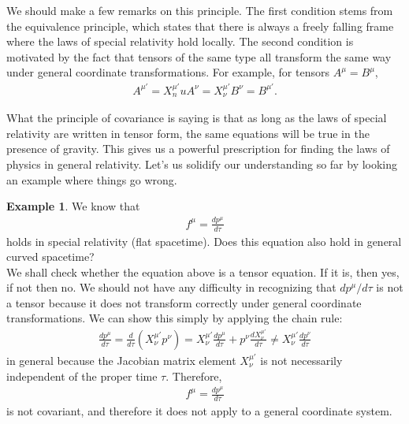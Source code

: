 \documentclass{book}
\theoremstyle{definition}
\newtheorem{exmp}{Example}[section]
\begin{document}
We should make a few remarks on this principle. The first condition stems from the equivalence principle, which states that there is always a freely falling frame where the laws of special relativity hold locally. The second condition is motivated by the fact that tensors of the same type all transform the same way under general coordinate transformations. For example, for tensors $A^{\mu} = B^\mu$,
\begin{align*}
A^{\mu'} = X^{\mu'}_nuA^\nu = X^{\mu'}_\nu B^{\nu} = B^{\mu'}.
\end{align*}

What the principle of covariance is saying is that as long as the laws of special relativity are written in tensor form, the same equations will be true in the presence of gravity. This gives us a powerful prescription for finding the laws of physics in general relativity. Let's us solidify our understanding so far by looking an example where things go wrong.\\
\begin{exmp}
	We know that 
	\begin{align*}
	f^\mu = \frac{dp^\mu}{d\tau}
	\end{align*}
	holds in special relativity (flat spacetime). Does this equation also hold in general curved spacetime?\\
	
	We shall check whether the equation above is a tensor equation. If it is, then yes, if not then no. We should not have any difficulty in recognizing that $dp^\mu/d\tau$ is not a tensor because it does not transform correctly under general coordinate transformations. We can show this simply by applying the chain rule:
	\begin{align*}
	\frac{dp^\mu}{d\tau} = \frac{d}{d\tau}\left(X^{\mu'}_\nu p^{\nu} \right) = X^{\mu'}_\nu\frac{dp^\mu}{d\tau} + p^\nu\frac{dX^{\mu'}_\nu}{d\tau} \neq X^{\mu'}_\nu \frac{dp^\nu}{d\tau}
	\end{align*}
	in general because the Jacobian matrix element $X^{\mu'}_\nu$ is not necessarily independent of the proper time $\tau$. Therefore, 
	\begin{align*}
	f^\mu = \frac{dp^\mu}{d\tau}
	\end{align*}
	is not covariant, and therefore it does not apply to a general coordinate system.\\
\end{exmp}
\end{document}
